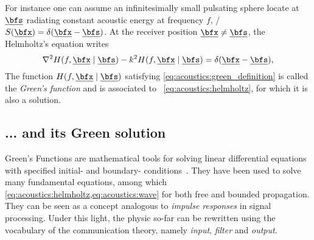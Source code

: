For instance one can assume an infinitesimally small pulsating sphere locate at $\positionSource$ radiating constant acoustic energy at frequency $f$,
\ie/ $S(\positionMicrophone) = \delta(\positionMicrophone - \positionSource)$.
At the receiver position $\positionMicrophone \neq \positionSource$, the Helmholtz's equation writes
\begin{equation}
    \label{eq:acoustics:green_definition}
    \knabla^2 H(f, \positionMicrophone \mid \positionSource)
        - k^2 H(f, \positionMicrophone \mid \positionSource)
        = \delta(\positionMicrophone - \positionSource)
    ,
\end{equation}
The function $H(f, \positionMicrophone \mid \positionSource)$ satisfying \cref{eq:acoustics:green_definition} is called the \textit{Green's function} and is
associated to ~\cref{eq:acoustics:helmholtz}, for which it is also a solution.

\subsection{... and its Green solution}
Green's Functions are mathematical tools for solving linear differential equations with specified initial- and boundary- conditions~.
They have been used to solve many fundamental equations, among which \cref{eq:acoustics:helmholtz,eq:acoustics:wave} for both free and bounded propagation.
They can be seen as a concept analogous to \emph{impulse responses} in signal processing.
Under this light, the physic so-far can be rewritten using the vocabulary of the communication theory, namely \textit{input}, \textit{filter} and \textit{output}.

